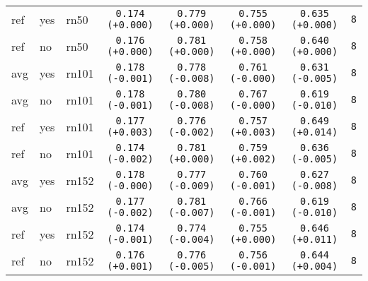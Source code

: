 \begin{tabular}{|l|l|l|c|c|c|c|c|}
\rowcolor{verylightgray}ref & yes & rn50 & \texttt{0.174 {\color{black}(+0.000)}} & \texttt{0.779 {\color{black}(+0.000)}} & \texttt{0.755 {\color{black}(+0.000)}} & \texttt{0.635 {\color{black}(+0.000)}} & \texttt{8} \\
\rowcolor{verylightgray}ref & no & rn50 & \texttt{0.176 {\color{black}(+0.000)}} & \texttt{0.781 {\color{black}(+0.000)}} & \texttt{0.758 {\color{black}(+0.000)}} & \texttt{0.640 {\color{black}(+0.000)}} & \texttt{8} \\
\hline
avg & yes & rn101 & \texttt{0.178 {\color{red}(-0.001)}} & \texttt{0.778 {\color{green}(-0.008)}} & \texttt{0.761 {\color{black}(-0.000)}} & \texttt{0.631 {\color{red}(-0.005)}} & \texttt{8} \\
avg & no & rn101 & \texttt{0.178 {\color{red}(-0.001)}} & \texttt{0.780 {\color{green}(-0.008)}} & \texttt{0.767 {\color{black}(-0.000)}} & \texttt{0.619 {\color{red}(-0.010)}} & \texttt{8} \\
ref & yes & rn101 & \texttt{0.177 {\color{green}(+0.003)}} & \texttt{0.776 {\color{green}(-0.002)}} & \texttt{0.757 {\color{red}(+0.003)}} & \texttt{0.649 {\color{green}(+0.014)}} & \texttt{8} \\
ref & no & rn101 & \texttt{0.174 {\color{red}(-0.002)}} & \texttt{0.781 {\color{black}(+0.000)}} & \texttt{0.759 {\color{red}(+0.002)}} & \texttt{0.636 {\color{red}(-0.005)}} & \texttt{8} \\
\hline
avg & yes & rn152 & \texttt{0.178 {\color{black}(-0.000)}} & \texttt{0.777 {\color{green}(-0.009)}} & \texttt{0.760 {\color{green}(-0.001)}} & \texttt{0.627 {\color{red}(-0.008)}} & \texttt{8} \\
avg & no & rn152 & \texttt{0.177 {\color{red}(-0.002)}} & \texttt{0.781 {\color{green}(-0.007)}} & \texttt{0.766 {\color{green}(-0.001)}} & \texttt{0.619 {\color{red}(-0.010)}} & \texttt{8} \\
ref & yes & rn152 & \texttt{0.174 {\color{red}(-0.001)}} & \texttt{0.774 {\color{green}(-0.004)}} & \texttt{0.755 {\color{black}(+0.000)}} & \texttt{0.646 {\color{green}(+0.011)}} & \texttt{8} \\
ref & no & rn152 & \texttt{0.176 {\color{green}(+0.001)}} & \texttt{0.776 {\color{green}(-0.005)}} & \texttt{0.756 {\color{green}(-0.001)}} & \texttt{0.644 {\color{green}(+0.004)}} & \texttt{8} \\
\hline
\end{tabular}
